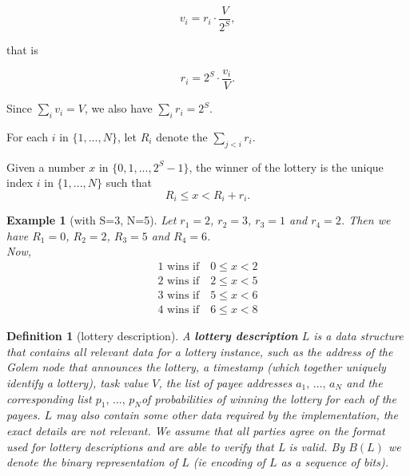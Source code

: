 \documentclass[a4paper]{article}
\newtheorem*{dfnt}{Definition}
\newtheorem*{exmp}{Example}
\begin{document}
    \begin{displaymath}
        v_i = r_i \cdot \frac{V}{2^S},
    \end{displaymath}

    that is

    \begin{displaymath}
        r_i = 2^S \cdot \frac{v_i}{V}.
    \end{displaymath}

    Since $\sum_i v_i = V$, we also have $\sum_i r_i = 2^S$.

    For each $i$ in $\{1, ..., N\}$, let $R_i$ denote the $\sum_{j<i} r_i$.

    Given a number $x$ in $\{0, 1 ,... ,2^S-1\}$, the winner of the lottery is the unique index $i$ in $\{1, ..., N\}$
    such that
    \begin{displaymath}
        R_i \leq x < R_i+r_i.
    \end{displaymath}

    \begin{exmp}[with S=3, N=5]
        Let $r_1 = 2$, $r_2 = 3$, $r_3 = 1$ and $r_4 = 2$. Then we have $R_1 = 0$, $R_2 = 2$, $R_3 = 5$ and $R_4 = 6$.\\
        Now,
        \begin{displaymath}
            \begin{array}{c}
                1 \text{ wins if} \quad 0 \leq x < 2\\
                2 \text{ wins if} \quad 2 \leq x < 5\\
                3 \text{ wins if} \quad 5 \leq x < 6\\
                4 \text{ wins if} \quad 6 \leq x < 8
            \end{array}
        \end{displaymath}
    \end{exmp}

    \begin{dfnt}[lottery description]
        A \textbf{lottery description} $L$ is a data structure that contains all relevant data for a lottery instance,
        such as the address of the Golem node that announces the lottery, a timestamp (which together uniquely identify
        a lottery), task value $V$, the list of payee addresses $a_1,\,\ldots,\, a_N$ and the corresponding list
        $p_1, \,\ldots,\, p_N $of probabilities of winning the lottery for each of the payees. $L$ may also contain
        some other data required by the implementation, the exact details are not relevant. We assume that all parties
        agree on the format used for lottery descriptions and are able to verify that L is valid. By $B(L)$ we denote
        the binary representation of $L$ (ie encoding of $L$ as a sequence of bits).
    \end{dfnt}
\end{document}
